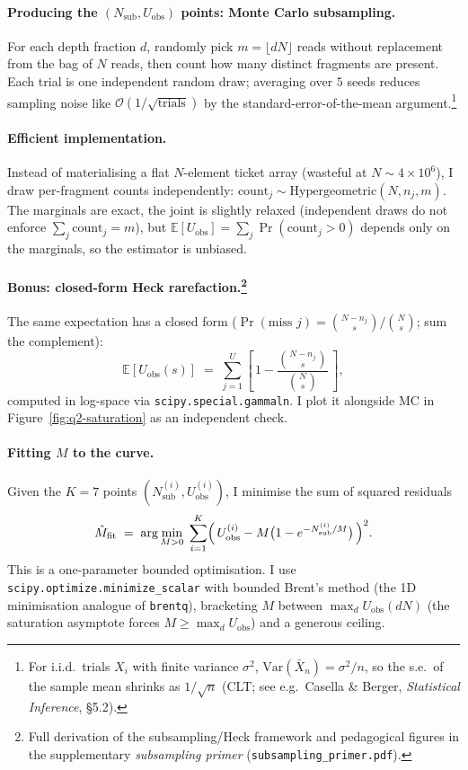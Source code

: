 \documentclass[11pt,a4paper]{article}
\newcommand{\E}{\mathbb{E}}
\newcommand{\Var}{\mathrm{Var}}
\newcommand{\hM}{\hat{M}}
\newcommand{\Nsub}{N_{\mathrm{sub}}}
\newcommand{\Uobs}{U_{\mathrm{obs}}}
\begin{document}
\paragraph{Producing the $(\Nsub, \Uobs)$ points: Monte Carlo subsampling.}
For each depth fraction $d$, randomly pick $m = \lfloor dN \rfloor$ reads without
replacement from the bag of $N$ reads, then count how many distinct fragments are
present. Each trial is one independent random draw; averaging over $5$ seeds
reduces sampling noise like $\mathcal{O}(1/\sqrt{\text{trials}})$ by the
standard-error-of-the-mean argument.\footnote{For i.i.d.\ trials $X_i$ with
finite variance $\sigma^2$, $\Var(\bar X_n) = \sigma^2/n$, so the s.e.\ of the
sample mean shrinks as $1/\sqrt{n}$ (CLT; see e.g.\ Casella \& Berger,
\emph{Statistical Inference}, \S5.2).}

\paragraph{Efficient implementation.}
Instead of materialising a flat $N$-element ticket array (wasteful at
$N \sim 4 \times 10^{6}$), I draw per-fragment counts independently:
$\mathrm{count}_j \sim \mathrm{Hypergeometric}(N, n_j, m)$. The marginals are exact,
the joint is slightly relaxed (independent draws do not enforce
$\sum_j \mathrm{count}_j = m$), but
$\E[\Uobs] = \sum_j \Pr(\mathrm{count}_j > 0)$ depends only on the marginals, so
the estimator is unbiased.

\paragraph{Bonus: closed-form Heck rarefaction.\protect\footnote{Full derivation
of the subsampling/Heck framework and pedagogical figures in the supplementary
\emph{subsampling primer} (\texttt{subsampling\_primer.pdf}).}}
The same expectation has a closed form ($\Pr(\text{miss }j) = \binom{N-n_j}{s}/\binom{N}{s}$;
sum the complement):
\begin{equation}
   \E\!\left[\Uobs(s)\right] \;=\;
   \sum_{j=1}^{U} \!\left[\, 1 - \frac{\binom{N - n_j}{s}}{\binom{N}{s}} \,\right],
   \label{eq:heck-q2}
\end{equation}
computed in log-space via \texttt{scipy.special.gammaln}. I plot it alongside MC in
Figure~\ref{fig:q2-saturation} as an independent check.

\paragraph{Fitting $M$ to the curve.}
Given the $K = 7$ points $(\Nsub^{(i)}, \Uobs^{(i)})$, I minimise the sum of squared
residuals
\[
   \hM_{\text{fit}} \;=\; \arg\min_{M > 0}\; \sum_{i=1}^{K}
   \Bigl(\, \Uobs^{(i)} - M\bigl(1 - e^{-\Nsub^{(i)}/M}\bigr) \,\Bigr)^2.
\]
This is a one-parameter bounded optimisation. I use
\texttt{scipy.optimize.minimize\_scalar} with bounded Brent's method (the 1D
minimisation analogue of \texttt{brentq}), bracketing $M$ between $\max_d \Uobs(dN)$
(the saturation asymptote forces $M \geq \max_d \Uobs$) and a generous ceiling.
\end{document}
